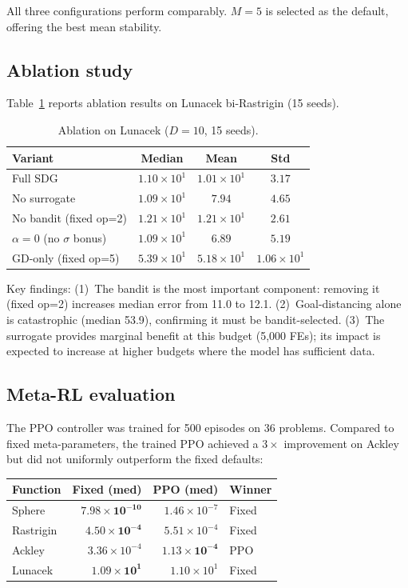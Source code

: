 \documentclass[preprint,12pt,number]{elsarticle}
\begin{document}
All three configurations perform comparably. $M = 5$ is selected as the default, offering the best mean stability.

\subsection{Ablation study}

Table~\ref{tab:ablation} reports ablation results on Lunacek bi-Rastrigin (15 seeds).

\begin{table}[h]
\centering
\caption{Ablation on Lunacek ($D = 10$, 15 seeds).}
\label{tab:ablation}
\begin{tabular}{lccc}
\toprule
Variant & Median & Mean & Std \\
\midrule
Full SDG & $1.10 \times 10^{1}$ & $1.01 \times 10^{1}$ & $3.17$ \\
No surrogate & $1.09 \times 10^{1}$ & $7.94$ & $4.65$ \\
No bandit (fixed op=2) & $1.21 \times 10^{1}$ & $1.21 \times 10^{1}$ & $2.61$ \\
$\alpha = 0$ (no $\sigma$ bonus) & $1.09 \times 10^{1}$ & $6.89$ & $5.19$ \\
GD-only (fixed op=5) & $5.39 \times 10^{1}$ & $5.18 \times 10^{1}$ & $1.06 \times 10^{1}$ \\
\bottomrule
\end{tabular}
\end{table}

Key findings: (1)~The bandit is the most important component: removing it (fixed op=2) increases median error from 11.0 to 12.1. (2)~Goal-distancing alone is catastrophic (median 53.9), confirming it must be bandit-selected. (3)~The surrogate provides marginal benefit at this budget (5{,}000 FEs); its impact is expected to increase at higher budgets where the model has sufficient data.

\subsection{Meta-RL evaluation}

The PPO controller was trained for 500 episodes on 36 problems. Compared to fixed meta-parameters, the trained PPO achieved a $3\times$ improvement on Ackley but did not uniformly outperform the fixed defaults:

\begin{center}
\begin{tabular}{lrrl}
\toprule
Function & Fixed (med) & PPO (med) & Winner \\
\midrule
Sphere & $\mathbf{7.98 \times 10^{-10}}$ & $1.46 \times 10^{-7}$ & Fixed \\
Rastrigin & $\mathbf{4.50 \times 10^{-4}}$ & $5.51 \times 10^{-4}$ & Fixed \\
Ackley & $3.36 \times 10^{-4}$ & $\mathbf{1.13 \times 10^{-4}}$ & PPO \\
Lunacek & $\mathbf{1.09 \times 10^{1}}$ & $1.10 \times 10^{1}$ & Fixed \\
\bottomrule
\end{tabular}
\end{center}
\end{document}
